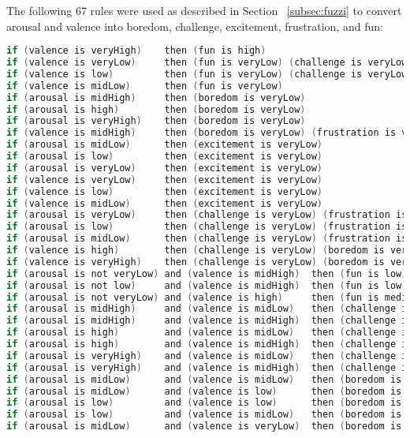 
The following 67 rules were used as described in Section ~\ref{subsec:fuzzi} to convert arousal and valence into boredom, challenge, excitement, frustration, and fun:

\begin{lstlisting}[language=c]
if (valence is veryHigh)    then (fun is high)
if (valence is veryLow)     then (fun is veryLow) (challenge is veryLow)
if (valence is low)         then (fun is veryLow) (challenge is veryLow)
if (valence is midLow)      then (fun is veryLow)
if (arousal is midHigh)     then (boredom is veryLow)
if (arousal is high)        then (boredom is veryLow)
if (arousal is veryHigh)    then (boredom is veryLow)
if (valence is midHigh)     then (boredom is veryLow) (frustration is veryLow)
if (arousal is midLow)      then (excitement is veryLow)
if (arousal is low)         then (excitement is veryLow)
if (arousal is veryLow)     then (excitement is veryLow)
if (valence is veryLow)     then (excitement is veryLow)
if (valence is low)         then (excitement is veryLow)
if (valence is midLow)      then (excitement is veryLow)
if (arousal is veryLow)     then (challenge is veryLow) (frustration is veryLow)
if (arousal is low)         then (challenge is veryLow) (frustration is veryLow)
if (arousal is midLow)      then (challenge is veryLow) (frustration is veryLow)
if (valence is high)        then (challenge is veryLow) (boredom is veryLow) (frustration is veryLow)
if (valence is veryHigh)    then (challenge is veryLow) (boredom is veryLow) (frustration is veryLow)
if (arousal is not veryLow) and (valence is midHigh)  then (fun is low)
if (arousal is not low)     and (valence is midHigh)  then (fun is low)
if (arousal is not veryLow) and (valence is high)     then (fun is medium)
if (arousal is midHigh)     and (valence is midLow)   then (challenge is low)
if (arousal is midHigh)     and (valence is midHigh)  then (challenge is low)
if (arousal is high)        and (valence is midLow)   then (challenge is medium)
if (arousal is high)        and (valence is midHigh)  then (challenge is medium)
if (arousal is veryHigh)    and (valence is midLow)   then (challenge is high)
if (arousal is veryHigh)    and (valence is midHigh)  then (challenge is high)
if (arousal is midLow)      and (valence is midLow)   then (boredom is low)
if (arousal is midLow)      and (valence is low)      then (boredom is medium)
if (arousal is low)         and (valence is low)      then (boredom is medium)
if (arousal is low)         and (valence is midLow)   then (boredom is medium)
if (arousal is midLow)      and (valence is veryLow)  then (boredom is high)

\end{lstlisting}
